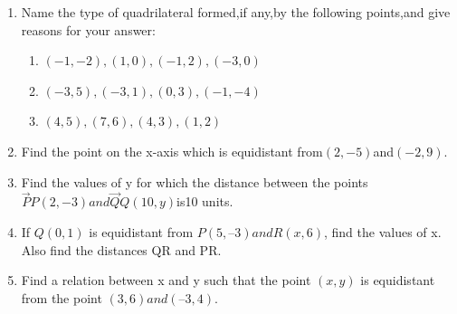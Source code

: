 \documentclass[12pt]{article}
\begin{document}
\begin{enumerate}
\item Name the type of quadrilateral formed,if any,by the following points,and give reasons for your answer:
\begin{enumerate}
\item $(-1,-2),(1,0),(-1,2),(-3,0)$
\item $(-3,5),(-3,1),(0,3),(-1,-4)$
\item $(4,5),(7,6),(4,3),(1,2)$
\end{enumerate}
\item Find the point on the x-axis which is equidistant from$(2,-5)$and$(-2,9)$.
\item Find the values of y for which the distance between the points                  $\vec{P}P(2,-3)and \vec{Q}Q(10,y)$is10 units.
\item  If $Q(0, 1)$ is equidistant from $P(5, –3) and R(x, 6)$, find the values of x. Also find the
distances QR and PR.
\item  Find a relation between x and y such that the point $(x, y)$ is equidistant from the point
$(3, 6) and (– 3, 4)$.

\end{enumerate}
\end{document}
